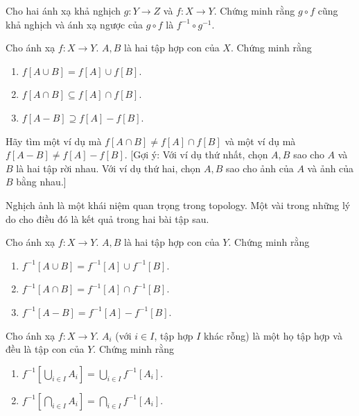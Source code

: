 \begin{exercise}
    Cho hai ánh xạ khả nghịch $g: Y\to Z$ và $f: X\to Y$. Chứng minh rằng $g\circ f$ cũng khả nghịch và ánh xạ ngược của $g\circ f$ là $f^{-1}\circ g^{-1}$.
\end{exercise}

\begin{exercise}
    Cho ánh xạ $f: X\to Y$. $A, B$ là hai tập hợp con của $X$. Chứng minh rằng
    \begin{enumerate}[label={(\roman*)}]
        \item $f[A\cup B] = f[A]\cup f[B]$.
        \item $f[A\cap B] \subseteq f[A]\cap f[B]$.
        \item $f[A - B] \supseteq f[A] - f[B]$.
    \end{enumerate}

    Hãy tìm một ví dụ mà $f[A\cap B]\ne f[A]\cap f[B]$ và một ví dụ mà $f[A - B]\ne f[A] - f[B]$. [Gợi ý: Với ví dụ thứ nhất, chọn $A, B$ sao cho $A$ và $B$ là hai tập rời nhau. Với ví dụ thứ hai, chọn $A, B$ sao cho ảnh của $A$ và ảnh của $B$ bằng nhau.]
\end{exercise}

Nghịch ảnh là một khái niệm quan trọng trong topology. Một vài trong những lý do cho điều đó là kết quả trong hai bài tập sau.

\begin{exercise}
    Cho ánh xạ $f: X\to Y$. $A, B$ là hai tập hợp con của $Y$. Chứng minh rằng
    \begin{enumerate}[label={(\roman*)}]
        \item $f^{-1}[A\cup B] = f^{-1}[A]\cup f^{-1}[B]$.
        \item $f^{-1}[A\cap B] = f^{-1}[A]\cap f^{-1}[B]$.
        \item $f^{-1}[A - B] = f^{-1}[A] - f^{-1}[B]$.
    \end{enumerate}
\end{exercise}

\begin{exercise}
    Cho ánh xạ $f: X\to Y$. $A_{i}$ (với $i\in I$, tập hợp $I$ khác rỗng) là một họ tập hợp và đều là tập con của $Y$. Chứng minh rằng
    \begin{enumerate}[label={(\roman*)}]
        \item $f^{-1}[\bigcup_{i\in I}A_{i}] = \bigcup_{i\in I} f^{-1}[A_{i}]$.
        \item $f^{-1}[\bigcap_{i\in I}A_{i}] = \bigcap_{i\in I} f^{-1}[A_{i}]$.
    \end{enumerate}
\end{exercise}

